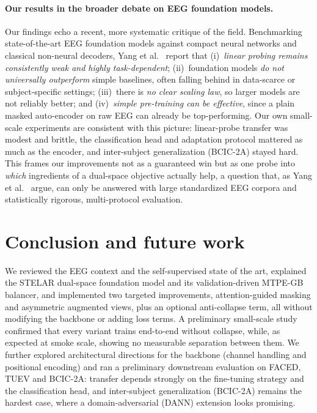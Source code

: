 \documentclass[11pt]{article}
\begin{document}
\paragraph{Our results in the broader debate on EEG foundation models.} Our
findings echo a recent, more systematic critique of the field. Benchmarking
state-of-the-art EEG foundation models against compact neural networks and
classical non-neural decoders, Yang et al.~\cite{yang2026eegfm} report that
(i)~\emph{linear probing remains consistently weak and highly task-dependent};
(ii)~foundation models \emph{do not universally outperform} simple baselines,
often falling behind in data-scarce or subject-specific settings; (iii)~there is
\emph{no clear scaling law}, so larger models are not reliably better; and
(iv)~\emph{simple pre-training can be effective}, since a plain masked
auto-encoder on raw EEG can already be top-performing. Our own small-scale
experiments are consistent with this picture: linear-probe transfer was modest
and brittle, the classification head and adaptation protocol mattered as much as
the encoder, and inter-subject generalization (BCIC-2A) stayed hard. This frames
our improvements not as a guaranteed win but as one probe into \emph{which}
ingredients of a dual-space objective actually help, a question that, as
Yang et al.~\cite{yang2026eegfm} argue, can only be answered with large standardized EEG
corpora and statistically rigorous, multi-protocol evaluation.

\section{Conclusion and future work}
\label{sec:conclusion}

We reviewed the EEG context and the self-supervised state of the art, explained
the STELAR dual-space foundation model and its validation-driven MTPE-GB balancer,
and implemented two targeted improvements, attention-guided masking and
asymmetric augmented views, plus an optional anti-collapse term, all without
modifying the backbone or adding loss terms. A preliminary small-scale study
confirmed that every variant trains end-to-end without collapse, while, as
expected at smoke scale, showing no measurable separation between them. We
further explored architectural directions for the backbone (channel handling and
positional encoding) and ran a preliminary downstream evaluation on FACED, TUEV
and BCIC-2A: transfer depends strongly on the fine-tuning strategy and the
classification head, and inter-subject generalization (BCIC-2A) remains the
hardest case, where a domain-adversarial (DANN) extension looks promising.
\end{document}

